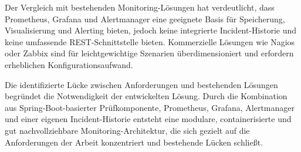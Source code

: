 Der Vergleich mit bestehenden Monitoring-Lösungen hat verdeutlicht, dass Prometheus, Grafana und Alertmanager eine geeignete Basis für Speicherung, Visualisierung und Alerting bieten, jedoch keine integrierte Incident-Historie und keine umfassende REST-Schnittstelle bieten. Kommerzielle Lösungen wie Nagios oder Zabbix sind für leichtgewichtige Szenarien überdimensioniert und erfordern erheblichen Konfigurationsaufwand.

Die identifizierte Lücke zwischen Anforderungen und bestehenden Lösungen begründet die Notwendigkeit der entwickelten Lösung. Durch die Kombination aus Spring-Boot-basierter Prüfkomponente, Prometheus, Grafana, Alertmanager und einer eigenen Incident-Historie entsteht eine modulare, containerisierte und gut nachvollziehbare Monitoring-Architektur, die sich gezielt auf die Anforderungen der Arbeit konzentriert und bestehende Lücken schließt.